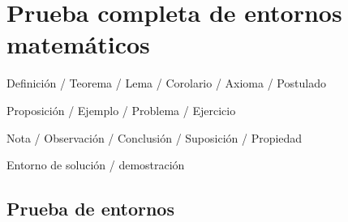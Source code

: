 \documentclass[es]{../../elegantbook}
\begin{document}
\chapter{Prueba completa de entornos matemáticos}
\begin{introduction}
\item Definición / Teorema / Lema / Corolario / Axioma / Postulado
\item Proposición / Ejemplo / Problema / Ejercicio
\item Nota / Observación / Conclusión / Suposición / Propiedad
\item Entorno de solución / demostración
\end{introduction}

\section{Prueba de entornos}
\end{document}
